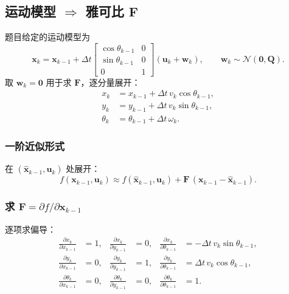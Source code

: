 \documentclass[12pt]{article}
\begin{document}
\subsection*{运动模型 $\Rightarrow$ 雅可比 $\mathbf{F}$}

题目给定的运动模型为
\[
\mathbf{x}_k = \mathbf{x}_{k-1}
+ \Delta t
\begin{bmatrix}
\cos\theta_{k-1} & 0\\
\sin\theta_{k-1} & 0\\
0 & 1
\end{bmatrix}
(\mathbf{u}_k+\mathbf{w}_k),
\qquad \mathbf{w}_k\sim\mathcal{N}(\mathbf{0},\mathbf{Q}).
\]
取 $\mathbf{w}_k=\mathbf{0}$ 用于求 $\mathbf{F}$，逐分量展开：
\[
\begin{aligned}
x_k       &= x_{k-1} + \Delta t\,v_k\cos\theta_{k-1},\\
y_k       &= y_{k-1} + \Delta t\,v_k\sin\theta_{k-1},\\
\theta_k  &= \theta_{k-1} + \Delta t\,\omega_k.
\end{aligned}
\]

\subsubsection*{一阶近似形式}

在 $(\hat{\mathbf{x}}_{k-1},\mathbf{u}_k)$ 处展开：
\[
f(\mathbf{x}_{k-1},\mathbf{u}_k)\approx
f(\hat{\mathbf{x}}_{k-1},\mathbf{u}_k)
+\mathbf{F}\,(\mathbf{x}_{k-1}-\hat{\mathbf{x}}_{k-1}).
\]

\subsubsection*{求 $\mathbf{F}=\partial f/\partial \mathbf{x}_{k-1}$}

逐项求偏导：
\begin{align*}
\frac{\partial x_k}{\partial x_{k-1}} &= 1, &
\frac{\partial x_k}{\partial y_{k-1}} &= 0, &
\frac{\partial x_k}{\partial \theta_{k-1}} &= -\Delta t\,v_k\sin\theta_{k-1},\\[4pt]
\frac{\partial y_k}{\partial x_{k-1}} &= 0, &
\frac{\partial y_k}{\partial y_{k-1}} &= 1, &
\frac{\partial y_k}{\partial \theta_{k-1}} &= \Delta t\,v_k\cos\theta_{k-1},\\[4pt]
\frac{\partial \theta_k}{\partial x_{k-1}} &= 0, &
\frac{\partial \theta_k}{\partial y_{k-1}} &= 0, &
\frac{\partial \theta_k}{\partial \theta_{k-1}} &= 1.
\end{align*}
\end{document}
